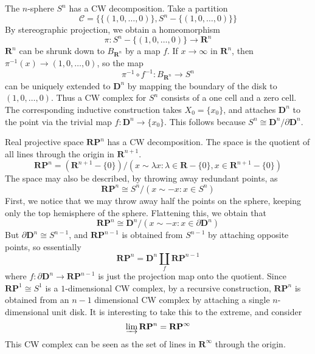 \begin{example}
    The $n$-sphere $S^n$ has a CW decomposition. Take a partition
    \[ \mathcal{C} = \{ \{ (1,0,\dots,0) \}, S^n - \{ (1,0,\dots,0) \} \} \]
    By stereographic projection, we obtain a homeomorphism
    \[ \pi: S^n - \{ (1,0,\dots,0) \} \to \mathbf{R}^n \]
    $\mathbf{R}^n$ can be shrunk down to $B_{\mathbf{R}^n}$ by a map $f$. If $x \to \infty$ in $\mathbf{R}^n$, then $\pi^{-1}(x) \to (1,0,\dots,0)$, so the map
    \[ \pi^{-1} \circ f^{-1}: B_{\mathbf{R}^n} \to S^n \]
    can be uniquely extended to $\mathbf{D}^n$ by mapping the boundary of the disk to $(1,0,\dots,0)$. Thus a CW complex for $S^n$ consists of a one cell and a zero cell. The corresponding inductive construction takes $X_0 = \{ x_0 \}$, and attaches $\mathbf{D}^n$ to the point via the trivial map $f: \mathbf{D}^n \to \{ x_0 \}$. This follows because $S^n \cong \mathbf{D}^n / \partial \mathbf{D}^n$.
\end{example}

\begin{example}
    Real projective space $\mathbf{R} \mathbf{P}^n$ has a CW decomposition. The space is the quotient of all lines through the origin in $\mathbf{R}^{n+1}$.
    \[ \mathbf{R} \mathbf{P}^n = (\mathbf{R}^{n+1} - \{ 0 \})/ ({x \sim \lambda x : \lambda \in \mathbf{R} - \{ 0 \}, x \in \mathbf{R}^{n+1}} - \{ 0 \}) \]
    The space may also be described, by throwing away redundant points, as
    \[ \mathbf{R} \mathbf{P}^n \cong S^n / {(x \sim -x : x \in S^n)} \]
    First, we notice that we may throw away half the points on the sphere, keeping only the top hemisphere of the sphere. Flattening this, we obtain that
    \[ \mathbf{R} \mathbf{P}^n \cong \mathbf{D}^n / {(x \sim -x : x \in \partial \mathbf{D}^n)} \]
    But $\partial \mathbf{D}^n \cong S^{n-1}$, and $\mathbf{R} \mathbf{P}^{n-1}$ is obtained from $S^{n-1}$ by attaching opposite points, so essentially
    \[ \mathbf{R} \mathbf{P}^n = \mathbf{D}^n \coprod_f \mathbf{R} \mathbf{P}^{n-1} \]
    where $f: \partial \mathbf{D}^n \to \mathbf{R} \mathbf{P}^{n-1}$ is just the projection map onto the quotient. Since $\mathbf{R} \mathbf{P}^1 \cong S^1$ is a $1$-dimensional CW complex, by a recursive construction, $\mathbf{R} \mathbf{P}^n$ is obtained from an $n-1$ dimensional CW complex by attaching a single $n$-dimensional unit disk. It is interesting to take this to the extreme, and consider
    \[ \varinjlim \mathbf{R} \mathbf{P}^n = \mathbf{R} \mathbf{P}^\infty \]
    This CW complex can be seen as the set of lines in $\mathbf{R}^\infty$ through the origin.
\end{example}

